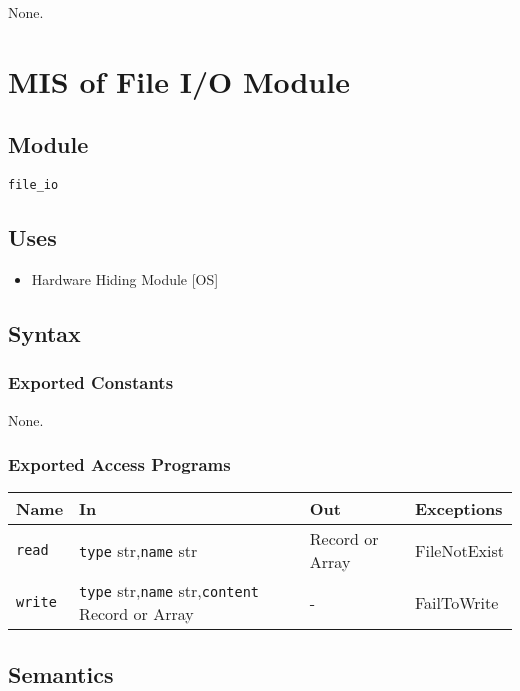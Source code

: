 \documentclass[12pt, titlepage]{article}
\begin{document}
None.


\newpage
\section{MIS of File I/O Module} \label{mFile} 

\subsection{Module}
\texttt{file\_io}

\subsection{Uses}
\begin{itemize}
\item Hardware Hiding Module [OS]
\end{itemize}

\subsection{Syntax}

\subsubsection{Exported Constants}
None.

\subsubsection{Exported Access Programs}

\begin{center}
\begin{tabular}{p{2cm} p{5cm} p{3cm} p{4cm}}
\hline
\textbf{Name} & \textbf{In} & \textbf{Out} & \textbf{Exceptions} \\
\hline
\texttt{read} & \texttt{type} str,\newline\texttt{name} str & Record or Array & FileNotExist \\
\texttt{write} & \texttt{type} str,\newline\texttt{name} str,\newline\texttt{content} Record or Array & - & FailToWrite \\
\hline
\end{tabular}
\end{center}

\subsection{Semantics}
\end{document}
